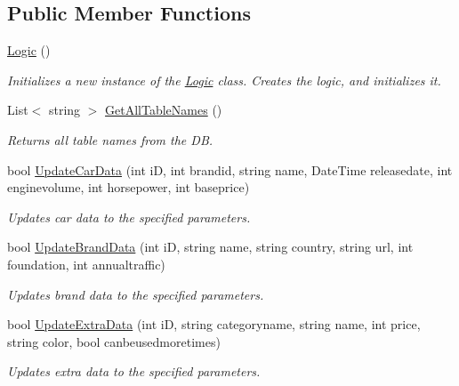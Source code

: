 \subsection*{Public Member Functions}
\begin{DoxyCompactItemize}
\item 
\mbox{\hyperlink{class_car_shop_1_1_logic_1_1_logic_af006d6f092e7d6adabc05cb8e546d829}{Logic}} ()
\begin{DoxyCompactList}\small\item\em Initializes a new instance of the \mbox{\hyperlink{class_car_shop_1_1_logic_1_1_logic}{Logic}} class. Creates the logic, and initializes it. \end{DoxyCompactList}\item 
List$<$ string $>$ \mbox{\hyperlink{class_car_shop_1_1_logic_1_1_logic_a91f3a4a292e1869a5bdb917dd2378435}{Get\+All\+Table\+Names}} ()
\begin{DoxyCompactList}\small\item\em Returns all table names from the DB. \end{DoxyCompactList}\item 
bool \mbox{\hyperlink{class_car_shop_1_1_logic_1_1_logic_a0a2f1ef0aa8204e30e8b3f86b1906a8d}{Update\+Car\+Data}} (int iD, int brandid, string name, Date\+Time releasedate, int enginevolume, int horsepower, int baseprice)
\begin{DoxyCompactList}\small\item\em Update\textquotesingle{}s car data to the specified parameters. \end{DoxyCompactList}\item 
bool \mbox{\hyperlink{class_car_shop_1_1_logic_1_1_logic_ab17048dea509f9de447af1ad960b012c}{Update\+Brand\+Data}} (int iD, string name, string country, string url, int foundation, int annualtraffic)
\begin{DoxyCompactList}\small\item\em Update\textquotesingle{}s brand data to the specified parameters. \end{DoxyCompactList}\item 
bool \mbox{\hyperlink{class_car_shop_1_1_logic_1_1_logic_ac692faa4c875e4dca31d23a3f71588b8}{Update\+Extra\+Data}} (int iD, string categoryname, string name, int price, string color, bool canbeusedmoretimes)
\begin{DoxyCompactList}\small\item\em Update\textquotesingle{}s extra data to the specified parameters. \end{DoxyCompactList}\item 

\end{DoxyCompactItemize}

